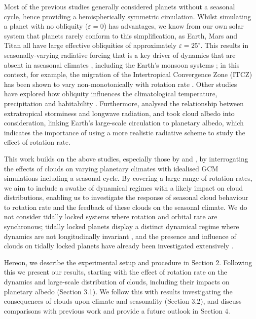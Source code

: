 Most of the previous studies generally considered planets without a seasonal cycle, hence providing a hemispherically symmetric circulation. Whilst simulating a planet with no obliquity ($\varepsilon=0$) has advantages, we know from our own solar system that planets rarely conform to this simplification, as Earth, Mars and Titan all have large effective obliquities of approximately $\varepsilon=25^\circ$. This results in seasonally-varying radiative forcing that is a key driver of dynamics that are absent in aseasonal climates \citep{guendelman2018-Axisymmetric, guendelman2019-Atmospheric, ohno2019_atmospheres, singh2019-Limits, hill2022-Theory}, including the Earth's monsoon systems \citep{bordoni2008-Monsoons, geen2018-Regime}; in this context, for example, the migration of the Intertropical Convergence Zone (ITCZ) has been shown to vary non-monotonically with rotation rate \citep{faulk2017-Effects,geen2018-Regime}. Other studies have explored how obliquity influences the climatological temperature, precipitation and habitability \citep{ferreira2014-Climate, kang2019-Mechanisms, kodama2022-Climate, linsenmeier2015-Climate, lobo2020-Atmospheric, he2022-Climate}. Furthermore, \citet{lobo2022-Role} analysed the relationship between extratropical storminess and longwave radiation, and \citet{hadas2023-Role} took cloud albedo into consideration, linking Earth's large-scale circulation to planetary albedo, which indicates the importance of using a more realistic radiative scheme to study the effect of rotation rate.



This work builds on the above studies, especially those by \citet{kaspi2015-ATMOSPHERIC} and \citet{komacek2019-Atmospheric}, by interrogating the effects of clouds on varying planetary climates with idealised GCM simulations including a seasonal cycle. By covering a large range of rotation rates, we aim to include a swathe of dynamical regimes with a likely impact on cloud distributions, enabling us to investigate the response of seasonal cloud behaviour to rotation rate and the feedback of these clouds on the seasonal climate. We do not consider tidally locked systems where rotation and orbital rate are synchronous; tidally locked planets display a distinct dynamical regime \citep{joshi1997-Simulations, noda2017-Circulation, haqq-misra2018-Demarcating, pierrehumbert2019-Atmospheric, wordsworth2022-Atmospheres} where dynamics are not longitudinally invariant \citep{merlis2010-Atmospheric, sergeev2020-Atmospheric, hammond2021-Rotational}, and the presence and influence of clouds on tidally locked planets have already been investigated extensively \citep{yang2013-STABILIZING, yang2019-Simulations, helling2021-Clouds, sergeev2022-TRAPPIST1}.


Hereon, we describe the experimental setup and procedure in Section 2. Following this we present our results, starting with the effect of rotation rate on the dynamics and large-scale distribution of clouds, including their impacts on planetary albedo (Section 3.1). We follow this with results investigating the consequences of clouds upon climate and seasonality (Section 3.2), and discuss comparisons with previous work and provide a future outlook in Section 4.